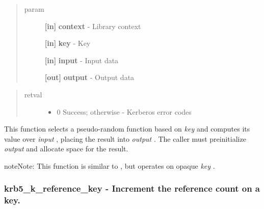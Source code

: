 \documentclass[letterpaper,10pt,english]{sphinxmanual}
\begin{document}
\begin{quote}\begin{description}
\item[{param}] \leavevmode
\textbf{{[}in{]}} \textbf{context} - Library context

\textbf{{[}in{]}} \textbf{key} - Key

\textbf{{[}in{]}} \textbf{input} - Input data

\textbf{{[}out{]}} \textbf{output} - Output data

\end{description}\end{quote}
\begin{quote}\begin{description}
\item[{retval}] \leavevmode\begin{itemize}
\item {} 
0   Success; otherwise - Kerberos error codes

\end{itemize}

\end{description}\end{quote}

This function selects a pseudo-random function based on \emph{key} and computes its value over \emph{input} , placing the result into \emph{output} . The caller must preinitialize \emph{output} and allocate space for the result.

\begin{notice}{note}{Note:}
This function is similar to {\hyperref[appdev/refs/api/krb5_c_prf:krb5_c_prf]{}} , but operates on opaque \emph{key} .
\end{notice}


\subsubsection{krb5\_k\_reference\_key -  Increment the reference count on a key.}
\label{appdev/refs/api/krb5_k_reference_key::doc}\label{appdev/refs/api/krb5_k_reference_key:krb5-k-reference-key-increment-the-reference-count-on-a-key}

\begin{fulllineitems}
\label{appdev/refs/api/krb5_k_reference_key:krb5_k_reference_key}
\end{fulllineitems}
\end{document}
